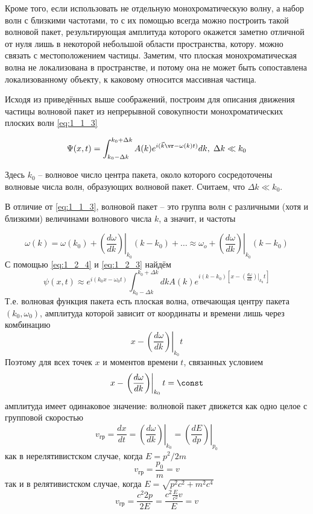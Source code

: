 Кроме того, если использовать не отдельную монохроматическую волну, а набор волн с близкими частотами, то с их помощью всегда можно построить такой волновой пакет, результирующая амплитуда которого окажется заметно отличной от нуля лишь в некоторой небольшой области пространства, котору. можно связать с местоположением частицы. Заметим, что плоская монохроматическая волна не локализована в пространстве, и потому она не может быть сопоставлена локализованному объекту, к каковому относится массивная частица.

Исходя из приведённых выше соображений, построим для описания движения частицы волновой пакет из непрерывной совокупности монохроматических плоских волн \eqref{eq:1_1_3}

\begin{equation}
\label{eq:1_2_3}
\Psi(x,t) = \int^{k_0 + \Delta k}_{k_0 - \Delta k} A(k)e^{i(\vec{k}\vr - \omega (k) t)} dk, \; \Delta k\ll k_0
\end{equation}

Здесь $k_0$ -- волновое число центра пакета, около которого сосредоточены волновые числа волн, образующих волновой пакет. Считаем, что $\Delta k \ll k_0$.

В отличие от \eqref{eq:1_1_3}, волновой пакет -- это группа волн с различными (хотя и близкими) величинами волнового числа $k$, а значит, и частоты

\begin{equation}
\label{eq:1_2_4}
\omega (k) = \omega (k_0) + \left. \left ( \frac{d \omega}{dk} \right ) \right |_{k_0} (k-k_0) + \ldots \approx \omega_o +  \left. \left ( \frac{d \omega}{dk} \right ) \right |_{k_0} (k-k_0)
\end{equation}%
%
С помощью \eqref{eq:1_2_4} и \eqref{eq:1_2_3} найдём
\begin{equation}
\label{eq:1_2_5}
\psi(x,t) \approx e^{i(k_0 x - \omega_0 t) }\int^{k_0 + \Delta k}_{k_0 - \Delta k} dk A(k)e^{i(k - k_0) \left [ x - \left . \left ( \frac{d\omega}{dk} \right ) \right |_{k_0} t \right ]}
\end{equation}%
%
Т.е. волновая функция пакета есть плоская волна, отвечающая центру пакета $(k_0, \omega_0)$, амплитуда которой зависит от координаты и времени лишь через комбинацию
$$
x - \left . \left ( \frac{d\omega}{dk} \right ) \right |_{k_0} t
$$
Поэтому для всех точек $x$ и моментов времени $t$, связанных условием
\begin{equation}
\label{eq:1_2_6}
x - \left . \left ( \frac{d\omega}{dk} \right ) \right |_{k_0} t = \const
\end{equation}
амплитуда имеет одинаковое значение: волновой пакет движется как одно целое с групповой скоростью
\begin{equation}
\label{eq:1_2_7}
v_{\text{гр}} = \frac{dx}{dt} = \left . \left ( \frac{d\omega}{dk} \right ) \right |_{k_0} = \left . \left ( \frac{dE}{dp} \right ) \right |_{p_0}
\end{equation}%
%
как в нерелятивистском случае, когда $E = p^2/{2m}$
$$
v_{\text{гр}} = \frac{p_0}{m} = v
$$
так и в релятивистском случае, когда $E = \sqrt{p^2c^2 + m^2c^4}$
$$
v_{\text{гр}} = \frac{c^2 2p}{2E} = \frac{c^2 \frac{E}{c^2}v}{E} = v
$$

